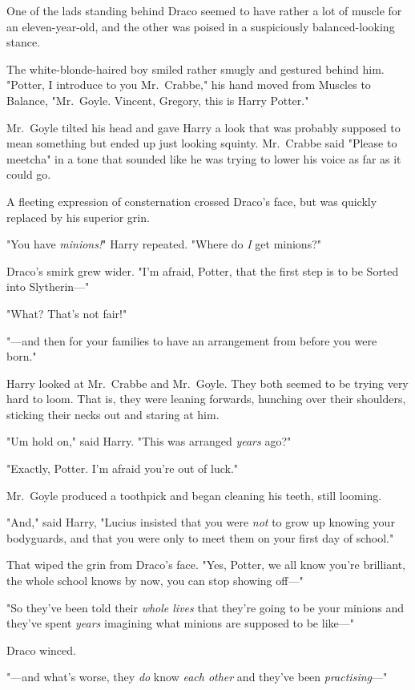 One of the lads standing behind Draco seemed to have rather a lot of muscle for
an eleven-year-old, and the other was poised in a suspiciously balanced-looking
stance.

The white-blonde-haired boy smiled rather smugly and gestured behind him.
"Potter, I introduce to you Mr.~Crabbe," his hand moved from Muscles to
Balance, "Mr.~Goyle. Vincent, Gregory, this is Harry Potter."

Mr.~Goyle tilted his head and gave Harry a look that was probably supposed to
mean something but ended up just looking squinty. Mr.~Crabbe said "Please to
meetcha" in a tone that sounded like he was trying to lower his voice as far as
it could go.

A fleeting expression of consternation crossed Draco's face, but was quickly
replaced by his superior grin.

"You have \emph{minions!}" Harry repeated. "Where do \emph{I} get minions?"

Draco's smirk grew wider. "I'm afraid, Potter, that the first step is to be
Sorted into Slytherin—"

"What? That's not fair!"

"—and then for your families to have an arrangement from before you were
born."

Harry looked at Mr.~Crabbe and Mr.~Goyle. They both seemed to be trying very
hard to loom. That is, they were leaning forwards, hunching over their
shoulders, sticking their necks out and staring at him.

"Um{\el} hold on," said Harry. "This was arranged \emph{years} ago?"

"Exactly, Potter. I'm afraid you're out of luck."

Mr.~Goyle produced a toothpick and began cleaning his teeth, still looming.

"And," said Harry, "Lucius insisted that you were \emph{not} to grow up knowing
your bodyguards, and that you were only to meet them on your first day of
school."

That wiped the grin from Draco's face. "Yes, Potter, we all know you're
brilliant, the whole school knows by now, you can stop showing off—"

"So they've been told their \emph{whole lives} that they're going to be your
minions and they've spent \emph{years} imagining what minions are supposed to
be like—"

Draco winced.

"—and what's worse, they \emph{do} know \emph{each other} and they've been
\emph{practising}—"

